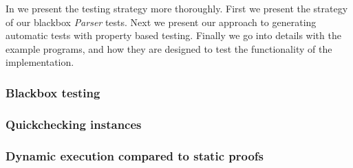 In  we present the testing strategy more thoroughly.
First we present the strategy of our blackbox \textit{Parser} tests. 
Next we present our approach to generating automatic tests with property based testing. 
Finally we go into details with the example programs, and how they are designed to test the functionality of the implementation.

\subsubsection{Blackbox testing}\label{sec:blackbox}


\subsubsection{Quickchecking instances}\label{sec:qc}


\subsubsection{Dynamic execution compared to static proofs}\label{sec:examples}


